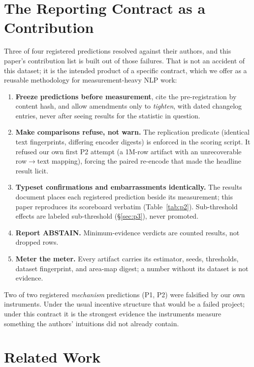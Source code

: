 \documentclass[11pt]{article}
\begin{document}
\section{The Reporting Contract as a Contribution}
\label{sec:methodology}

Three of four registered predictions resolved against their authors, and
this paper's contribution list is built out of those failures. That is not
an accident of this dataset; it is the intended product of a specific
contract, which we offer as a reusable methodology for measurement-heavy
NLP work:

\begin{enumerate}
\item \textbf{Freeze predictions before measurement}, cite the
pre-registration by content hash, and allow amendments only to
\emph{tighten}, with dated changelog entries, never after seeing results
for the statistic in question.
\item \textbf{Make comparisons refuse, not warn.} The replication
predicate (identical text fingerprints, differing encoder digests) is
enforced in the scoring script. It refused our own first P2 attempt (a 1M-row
artifact with an unrecoverable row$\to$text mapping), forcing the paired
re-encode that made the headline result licit.
\item \textbf{Typeset confirmations and embarrassments identically.} The
results document places each registered prediction beside its measurement;
this paper reproduces its scoreboard verbatim (Table~\ref{tab:p2}).
Sub-threshold effects are labeled sub-threshold (\S\ref{sec:p3}), never
promoted.
\item \textbf{Report ABSTAIN.} Minimum-evidence verdicts are counted
results, not dropped rows.
\item \textbf{Meter the meter.} Every artifact carries its estimator,
seeds, thresholds, dataset fingerprint, and area-map digest; a number
without its dataset is not evidence.
\end{enumerate}

Two of two registered \emph{mechanism} predictions (P1, P2) were falsified
by our own instruments. Under the usual incentive structure that would be
a failed project; under this contract it is the strongest evidence the
instruments measure something the authors' intuitions did not already
contain. %

\section{Related Work}
\label{sec:related}
\end{document}
